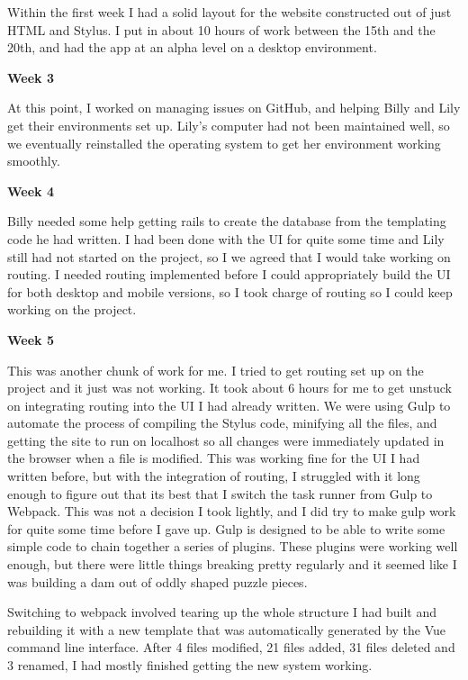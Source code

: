 Within the first week I had a solid layout for the website constructed out of just HTML and Stylus.
I put in about 10 hours of work between the 15th and the 20th, and had the app at an alpha level on a desktop environment.


\noindent\medskip\textbf{Week 3}

At this point, I worked on managing issues on GitHub, and helping Billy and Lily get their environments set up.
Lily’s computer had not been maintained well, so we eventually reinstalled the operating system to get her environment working smoothly.

\noindent\medskip\textbf{Week 4}

Billy needed some help getting rails to create the database from the templating code he had written.
I had been done with the UI for quite some time and Lily still had not started on the project, so I we agreed that I would take working on routing.
I needed routing implemented before I could appropriately build the UI for both desktop and mobile versions, so I took charge of routing so I could keep working on the project.

\noindent\medskip\textbf{Week 5}

This was another chunk of work for me.
I tried to get routing set up on the project and it just was not working.
It took about 6 hours for me to get unstuck on integrating routing into the UI I had already written.
We were using Gulp to automate the process of compiling the Stylus code, minifying all the files, and getting the site to run on localhost so all changes were immediately updated in the browser when a file is modified.
This was working fine for the UI I had written before, but with the integration of routing, I struggled with it long enough to figure out that its best that I switch the task runner from Gulp to Webpack.
This was not a decision I took lightly, and I did try to make gulp work for quite some time before I gave up.
Gulp is designed to be able to write some simple code to chain together a series of plugins.
These plugins were working well enough, but there were little things breaking pretty regularly and it seemed like I was building a dam out of oddly shaped puzzle pieces.

Switching to webpack involved tearing up the whole structure I had built and rebuilding it with a new template that was automatically generated by the Vue command line interface.
After 4 files modified, 21 files added, 31 files deleted and 3 renamed, I had mostly finished getting the new system working.

